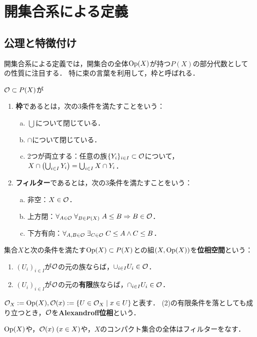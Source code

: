 \documentclass[uplatex,dvipdfmx]{jsreport}
\begin{document}
\section{開集合系による定義}

\subsection{公理と特徴付け}

\begin{tcolorbox}[colframe=ForestGreen, colback=ForestGreen!10!white,breakable,colbacktitle=ForestGreen!40!white,coltitle=black,fonttitle=\bfseries\sffamily,
title=]
    開集合系による定義では，開集合の全体$\mathrm{Op}(X)$が持つ$P(X)$の部分代数としての性質に注目する．
    特に束の言葉を利用して，枠と呼ばれる．
\end{tcolorbox}

\begin{definition}
    $\mathcal{O}\subset P(X)$が
    \begin{enumerate}
        \item \textbf{枠}であるとは，次の3条件を満たすことをいう：
        \begin{enumerate}[(a)]
            \item $\bigcup$について閉じている．
            \item $\cap$について閉じている．
            \item 2つが両立する：任意の族$\{Y_i\}_{i\in I}\subset\mathcal{O}$について，$X\cap\left(\bigcup_{i\in I}Y_i\right)=\bigcup_{i\in I}X\cap Y_i$．
        \end{enumerate}
        \item \textbf{フィルター}であるとは，次の3条件を満たすことをいう：
        \begin{enumerate}[(a)]
            \item 非空：$X\in\mathcal{O}$．
            \item 上方閉：$\forall_{A\in\mathcal{O}}\;\forall_{B\in P(X)}\;A\le B\Rightarrow B\in\mathcal{O}$．
            \item 下方有向：$\forall_{A,B\in\mathcal{O}}\;\exists_{C\in\mathcal{O}}\;C\le A\land C\le B$．
        \end{enumerate}
    \end{enumerate}
\end{definition}

\begin{definition}
    集合$X$と次の条件を満たす$\mathrm{Op}(X)\subset P(X)$との組$(X,\mathrm{Op}(X))$を\textbf{位相空間}という：
    \begin{enumerate}
        \item $(U_i)_{i\in I}$が$\mathcal{O}$の元の族ならば，$\cup_{i\in I}U_i\in\mathcal{O}$．
        \item $(U_i)_{i\in I}$が$\mathcal{O}$の元の\textbf{有限}族ならば，$\cap_{i\in I}U_i\in\mathcal{O}$．
    \end{enumerate}
    $\mathcal{O}_X:=\mathrm{Op}(X),\mathcal{O}(x):=\left\{U\in\mathcal{O}_X\mid x\in U\right\}$と表す．
    (2)の有限条件を落としても成り立つとき，$\mathcal{O}$を\textbf{Alexandroff位相}という．
\end{definition}
\begin{remarks}
    $\mathrm{Op}(X)$や，$\mathcal{O}(x)\;(x\in X)$や，$X$のコンパクト集合の全体はフィルターをなす．
\end{remarks}
\end{document}

